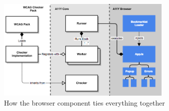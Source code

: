 \begin{figure}[H]
\centering
\includegraphics[width=0.75\textwidth]{figures/a11y_tool_browser_design}
\captionsetup{justification=centering}
\caption{How the browser component ties everything together
\label{fig:a11y_tool_browser_design}}
\end{figure}


%
%
%
%
